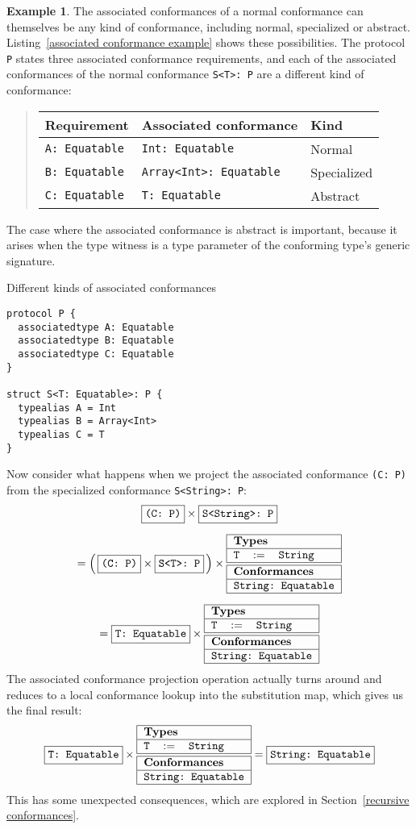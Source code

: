 \documentclass[a4paper,headsepline,bibliography=totoc,toc=flat,fleqn,twoside=semi]{scrbook}
\theoremstyle{definition}
\theoremstyle{definition}
\newtheorem{example}{Example}[chapter]
\theoremstyle{definition}
\newcommand{\ttbox}[1]{\boxed{\mbox{\vphantom{pI\texttt{pI}}\texttt{#1}}}}
\newcommand{\SubMapC}[2]{\begin{tabular}{|lll|}
\hline
\multicolumn{3}{|l|}{\textbf{Types}}\\
\hline
#1\\
\hline
\hline
\multicolumn{3}{|l|}{\textbf{Conformances}}\\
\hline
#2\\
\hline
\end{tabular}}
\newcommand{\SubType}[2]{\texttt{#1}&$:=$&\texttt{#2}}
\newcommand{\SubConf}[1]{\multicolumn{3}{|l|}{\texttt{#1}}}
\begin{document}
\begin{example}
The associated conformances of a normal conformance can themselves be any kind of conformance, including normal, specialized or abstract. Listing~\ref{associated conformance example} shows these possibilities. The protocol \texttt{P} states three associated conformance requirements, and each of the associated conformances of the normal conformance \verb|S<T>: P| are a different kind of conformance:
\begin{quote}
\begin{tabular}{|l|l|l|}
\hline
\textbf{Requirement}&\textbf{Associated conformance}&\textbf{Kind}\\
\hline
\verb|A: Equatable|&\verb|Int: Equatable|&Normal\\
\verb|B: Equatable|&\verb|Array<Int>: Equatable|&Specialized\\
\verb|C: Equatable|&\verb|T: Equatable|&Abstract\\
\hline
\end{tabular}
\end{quote}
The case where the associated conformance is abstract is important, because it arises when the type witness is a type parameter of the conforming type's generic signature.

\begin{listing}\caption{Different kinds of associated conformances}\label{associated conformance example}
\begin{Verbatim}
protocol P {
  associatedtype A: Equatable
  associatedtype B: Equatable
  associatedtype C: Equatable
}

struct S<T: Equatable>: P {
  typealias A = Int
  typealias B = Array<Int>
  typealias C = T
}
\end{Verbatim}
\end{listing}
Now consider what happens when we project the associated conformance \verb|(C: P)| from the specialized conformance \verb|S<String>: P|:
\begin{gather*}
\ttbox{(C:\ P)} \times \ttbox{S<String>:\ P}\\[\medskipamount]
= \left(\, \ttbox{(C:\ P)} \times \ttbox{S<T>:\ P} \,\right) \times \SubMapC{\SubType{T}{String}}{\SubConf{String:\ Equatable}}\\[\medskipamount]
= \ttbox{T:\ Equatable} \times \SubMapC{\SubType{T}{String}}{\SubConf{String:\ Equatable}}
\end{gather*}
The associated conformance projection operation actually turns around and reduces to a local conformance lookup into the substitution map, which gives us the final result:
\[
\ttbox{T:\ Equatable} \times \SubMapC{\SubType{T}{String}}{\SubConf{String:\ Equatable}} = \ttbox{String:\ Equatable}
\]
This has some unexpected consequences, which are explored in Section~\ref{recursive conformances}.
\end{example}
\end{document}
